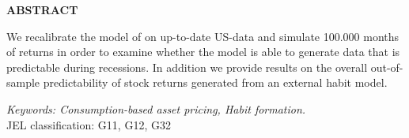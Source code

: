 \bigskip

\centerline{\bf ABSTRACT}

\begin{doublespace}  %
  \noindent We recalibrate the model of \citet{Campbell1999} on up-to-date US-data and simulate 100.000 months of returns in order to examine whether the model is able to generate data that is predictable during recessions. In addition we provide results on the overall out-of-sample predictability of stock returns generated from an external habit model.
\end{doublespace}

\medskip

\noindent \textit{Keywords: Consumption-based asset pricing, Habit formation.} \\

\noindent JEL classification: G11, G12, G32

           
  